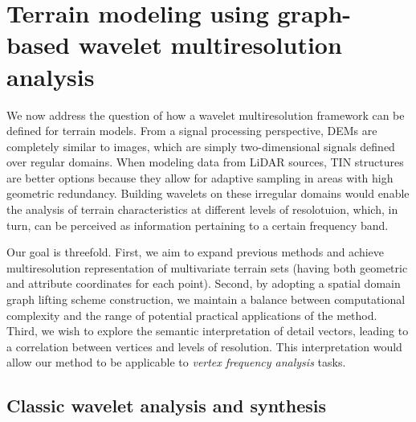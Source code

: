 \documentclass[graybox]{svmult}
\begin{document}
\section{Terrain modeling using graph-based wavelet multiresolution analysis}
We now address the question of how a wavelet multiresolution framework can be defined for terrain models. From a signal processing perspective, DEMs are completely similar to images, which are simply two-dimensional signals defined over regular domains. When modeling data from LiDAR sources, TIN structures are better options because they allow for adaptive sampling in areas with high geometric redundancy. Building wavelets on these irregular domains would enable the analysis of terrain characteristics at different levels of 
resolotuion, which, in turn, can be perceived as information pertaining to a certain frequency band.

Our goal is threefold. First, we aim to expand previous methods and achieve multiresolution representation of multivariate terrain sets (having both geometric and attribute coordinates for each point). Second, by adopting a spatial domain graph lifting scheme construction, we maintain a balance between computational complexity and the range of potential practical applications of the method. Third, we wish to explore the semantic interpretation of detail vectors, leading to a correlation between vertices and levels of resolution. This interpretation would allow our method to be applicable to \emph{vertex frequency analysis} tasks.

\subsection{Classic wavelet analysis and synthesis}
\end{document}

